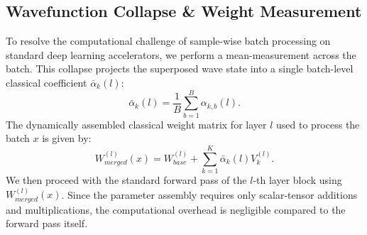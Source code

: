 \subsection{Wavefunction Collapse \& Weight Measurement}
To resolve the computational challenge of sample-wise batch processing on standard deep learning accelerators, we perform a mean-measurement across the batch. This collapse projects the superposed wave state into a single batch-level classical coefficient $\bar{\alpha}_k(l)$:
\begin{equation}
    \bar{\alpha}_k(l) = \frac{1}{B} \sum_{b=1}^B \alpha_{k, b}(l).
\end{equation}
The dynamically assembled classical weight matrix for layer $l$ used to process the batch $x$ is given by:
\begin{equation}
    W_{merged}^{(l)}(x) = W_{base}^{(l)} + \sum_{k=1}^K \bar{\alpha}_k(l) V_k^{(l)}.
\end{equation}
We then proceed with the standard forward pass of the $l$-th layer block using $W_{merged}^{(l)}(x)$. Since the parameter assembly requires only scalar-tensor additions and multiplications, the computational overhead is negligible compared to the forward pass itself.

